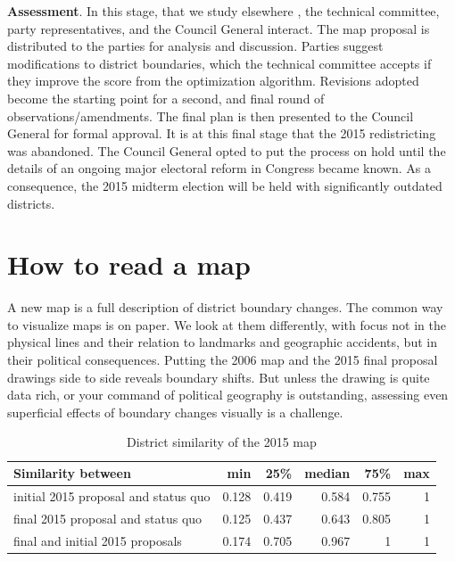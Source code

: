 \documentclass[letter,12pt]{article}
\begin{document}
\textbf{Assessment}. In this stage, that we study elsewhere \citep{altman.magar.mcd.trelles2014apsa}, the technical committee, party representatives, and the Council General interact. The map proposal is distributed to the parties for analysis and discussion. Parties suggest modifications to district boundaries, which the technical committee accepts if they improve the score from the optimization algorithm. Revisions adopted become the starting point for a second, and final round of observations/amendments. The final plan is then presented to the Council General for formal approval. It is at this final stage that the 2015 redistricting was abandoned. The Council General opted to put the process on hold until the details of an ongoing major electoral reform in Congress became known. As a consequence, the 2015 midterm election will be held with significantly outdated districts. 

\section{How to read a map}

A new map is a full description of district boundary changes. The common way to visualize maps is on paper. We look at them differently, with focus not in the physical lines and their relation to landmarks and geographic accidents, but in their political consequences. Putting the 2006 map and the 2015 final proposal drawings side to side reveals boundary shifts. But unless the drawing is quite data rich, or your command of political geography is outstanding, assessing even superficial effects of boundary changes visually is a challenge. 

\begin{table}
\begin{center}
  \begin{tabular}{lrrrrr}
  Similarity between                   &   min  &  25\%  & median &  75\% &  max \\ \hline
  initial 2015 proposal and status quo & 0.128  & 0.419  & 0.584  & 0.755 &  1   \\
  final 2015 proposal and status quo   & 0.125  & 0.437  & 0.643  & 0.805 &  1   \\
  final and initial 2015 proposals     & 0.174  & 0.705  & 0.967  & 1     &  1   \\
  \end{tabular}
  \caption{District similarity of the 2015 map}\label{T:simIndex}
\end{center}
\end{table}
\end{document}
